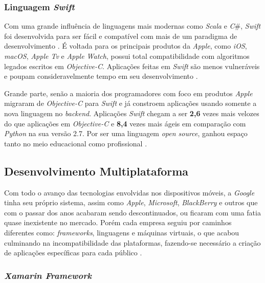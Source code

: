 \subsubsection{Linguagem \textit{Swift}}
Com uma grande influência de linguagens mais modernas como \textit{Scala} e \newcommand{\Csh}{\textit{C}{\lserif\#}}\Csh{}, \textit{Swift} foi desenvolvida para ser fácil e compatível com mais de um paradigma de desenvolvimento \cite{SwiftINFOQ2015}. É voltada para os principais produtos da \textit{Apple}, como \textit{iOS}, \textit{macOS}, \textit{Apple Tv} e \textit{Apple Watch}, possui total compatibilidade com algoritmos legados escritos em \textit{Objective-C}. Aplicações feitas em \textit{Swift} são menos vulneráveis e poupam consideravelmente tempo em seu desenvolvimento \cite{SwiftAPPLE2019}.

Grande parte, senão a maioria dos programadores com foco em produtos \textit{Apple} migraram de \textit{Objective-C} para \textit{Swift} e já constroem aplicações usando somente a nova linguagem no \textit{backend}. Aplicações \textit{Swift} chegam a ser \textbf{2,6} vezes mais velozes do que aplicações em \textit{Objective-C} e \textbf{8,4} vezes mais ágeis em comparação com \textit{Python} na sua versão 2.7. Por ser uma linguagem \textit{open source}, ganhou espaço tanto no meio educacional como profissional \cite{SwiftAPPLE2019}. 

\subsection{Desenvolvimento Multiplataforma}

Com todo o avanço das tecnologias envolvidas nos dispositivos móveis, a \textit{Google} tinha seu próprio sistema, assim como \textit{Apple}, \textit{Microsoft}, \textit{BlackBerry} e outros que com o passar dos anos acabaram sendo descontinuados, ou ficaram com uma fatia quase inexistente no mercado. Porém cada empresa seguiu por caminhos diferentes como: \textit{frameworks}, linguagens e máquinas virtuais, o que acabou culminando na incompatibilidade das plataformas, fazendo-se necessário a criação de aplicações específicas para cada público \cite{IONIC2017_ADRIAN_GOIS}.

\subsubsection{\textit{Xamarin Framework}}

